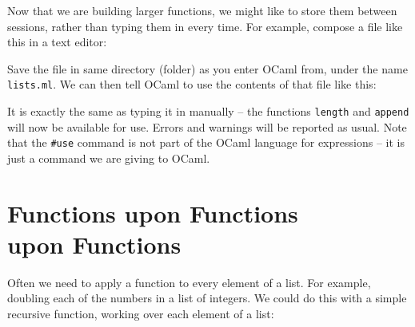 \documentclass[]{book}
\newcommand{\smspace}{\vspace{4mm}}
\begin{document}
Now that we are building larger functions, we might like to store them between sessions, rather than typing them in every time. For example, compose a file like this in a text editor:

\smspace
\begin{center}
\end{center}
\smspace

\noindent Save the file in same directory (folder) as you enter OCaml from, under the name \texttt{lists.ml}. We can then tell OCaml to use the contents of that file like this:

\smspace
\begin{center}
\end{center}
\smspace

\noindent {}It is exactly the same as typing it in manually -- the functions \texttt{length} and \texttt{append} will now be available for use. Errors and warnings will be reported as usual. Note that the \texttt{\#use} command is not part of the OCaml language for expressions -- it is just a command we are giving to OCaml.

\chapter[Functions upon Functions upon Functions]{Functions upon Functions\\ upon Functions}
\pagestyle{fancy}
\label{functionsuponfunctions}
Often we need to apply a function to every element of a list. For example, doubling each of the numbers in a list of integers. We could do this with a simple recursive function, working over each element of a list:
\end{document}
